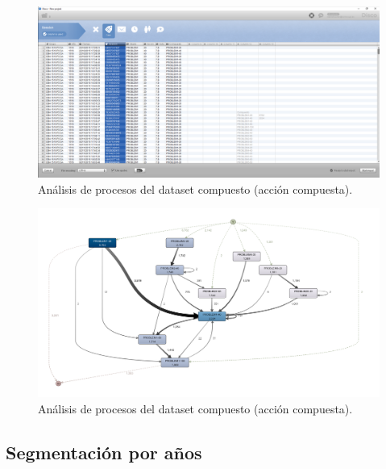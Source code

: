 \begin{figure}[H]
    \centering
    \includegraphics[width=1.25\textwidth]{imagenes/DISCO_compound/DISCO.png}
    \caption{Análisis de procesos del dataset compuesto (acción compuesta).}
    \label{fig:DISCO}
\end{figure}

\begin{figure}[H]
    \centering
    \includegraphics[width=1.25\textwidth]{imagenes/DISCO_compound/Dataset Fusionado - Compuesto.png}
    \caption{Análisis de procesos del dataset compuesto (acción compuesta).}
    \label{fig:datasetFusionadoCompuesto}
\end{figure}

\subsection{Segmentación por años}

